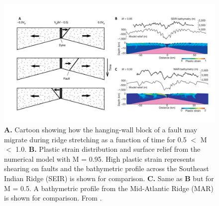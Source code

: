 \documentclass[letterpaper,12pt,notitle]{memphisthesis}                     %
\begin{document}
\begin{figure}[!htb]
	\centering
	\includegraphics[width=0.99\linewidth]{./figs/fig1.pdf}
	\caption{\textbf{A.} Cartoon showing how the hanging-wall block of a fault may migrate during ridge stretching as a function of time for 0.5 $<$ M $<$ 1.0. \textbf{B.} Plastic strain distribution and surface relief from the numerical model with M = 0.95. High plastic strain represents shearing on faults and the bathymetric profile across the Southeast Indian Ridge (SEIR) is shown for comparison. \textbf{C.} Same as \textbf{B} but for M = 0.5. A bathymetric profile from the Mid-Atlantic Ridge (MAR) is shown for comparison. From \citet{Buck2005}.}
	\label{fig:mfactor}
\end{figure}
\end{document}

